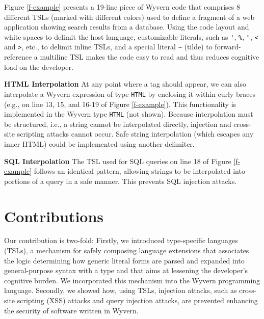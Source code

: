 \documentclass{sig-alternate}
\newcommand{\qs}[1]{}%
\let\li\lstinline
\begin{document}
Figure \ref{f-example} presents a 19-line piece of Wyvern code that comprises 8 different TSLs (marked with different colors) used to define a fragment of a web application showing search results from a database. Using the code layout and white-spaces to delimit the host language, customizable literals, such as \li{'}, \li{%

\textbf{HTML Interpolation} At any point where a tag should appear, we can also interpolate a Wyvern expression of type \li{HTML} by enclosing it within curly braces (e.g., on line 13, 15, and 16-19 of Figure \ref{f-example}). This functionality is implemented in the Wyvern type \li{HTML} (not shown). Because interpolation must be structured, i.e., a string cannot be interpolated directly, injection and cross-site scripting attacks cannot occur. Safe string interpolation (which escapes any inner HTML) could be implemented using another delimiter.

\textbf{SQL Interpolation} The TSL used for SQL queries on line 18 of Figure \ref{f-example} follows an identical pattern, allowing strings to be interpolated into portions of a query in a safe manner. This prevents SQL injection attacks.

\section{Contributions}
\qs{Clearly show how the results of your work contribute to computer science and explain the significance of those results.}

Our contribution is two-fold: Firstly, we introduced type-specific languages (TSLs), a mechanism for safely composing language extensions that associates the logic determining how generic literal forms are parsed and expanded into general-purpose syntax with a type and that aims at lessening the developer's cognitive burden. We incorporated this mechanism into the Wyvern programming language. Secondly, we showed how, using TSLs, injection attacks, such as cross-site scripting (XSS) attacks and query injection attacks, are prevented enhancing the security of software written in Wyvern.



\small

\end{document}

